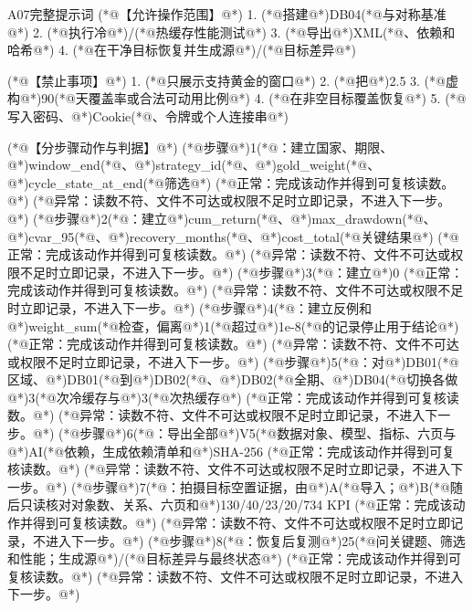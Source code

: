 \documentclass[UTF8,openany,zihao=-4]{ctexbook}
\renewcommand{\_}{\textunderscore\allowbreak}
\begin{document}
\begin{PromptBox}{A07完整提示词}
(*@{\promptcjk 【允许操作范围】}@*)
1. (*@{\promptcjk 搭建}@*)DB04(*@{\promptcjk 与对称基准}@*)
2. (*@{\promptcjk 执行冷}@*)/(*@{\promptcjk 热缓存性能测试}@*)
3. (*@{\promptcjk 导出}@*)XML(*@{\promptcjk 、依赖和哈希}@*)
4. (*@{\promptcjk 在干净目标恢复并生成源}@*)/(*@{\promptcjk 目标差异}@*)

(*@{\promptcjk 【禁止事项】}@*)
1. (*@{\promptcjk 只展示支持黄金的窗口}@*)
2. (*@{\promptcjk 把}@*)2.5%
3. (*@{\promptcjk 虚构}@*)90(*@{\promptcjk 天覆盖率或合法可动用比例}@*)
4. (*@{\promptcjk 在非空目标覆盖恢复}@*)
5. (*@{\promptcjk 写入密码、}@*)Cookie(*@{\promptcjk 、令牌或个人连接串}@*)

(*@{\promptcjk 【分步骤动作与判据】}@*)
(*@{\promptcjk 步骤}@*)1(*@{\promptcjk ：建立国家、期限、}@*)window_end(*@{\promptcjk 、}@*)strategy_id(*@{\promptcjk 、}@*)gold_weight(*@{\promptcjk 、}@*)cycle_state_at_end(*@{\promptcjk 筛选}@*)
  (*@{\promptcjk 正常：完成该动作并得到可复核读数。}@*)
  (*@{\promptcjk 异常：读数不符、文件不可达或权限不足时立即记录，不进入下一步。}@*)
(*@{\promptcjk 步骤}@*)2(*@{\promptcjk ：建立}@*)cum_return(*@{\promptcjk 、}@*)max_drawdown(*@{\promptcjk 、}@*)cvar_95(*@{\promptcjk 、}@*)recovery_months(*@{\promptcjk 、}@*)cost_total(*@{\promptcjk 关键结果}@*)
  (*@{\promptcjk 正常：完成该动作并得到可复核读数。}@*)
  (*@{\promptcjk 异常：读数不符、文件不可达或权限不足时立即记录，不进入下一步。}@*)
(*@{\promptcjk 步骤}@*)3(*@{\promptcjk ：建立}@*)0%
  (*@{\promptcjk 正常：完成该动作并得到可复核读数。}@*)
  (*@{\promptcjk 异常：读数不符、文件不可达或权限不足时立即记录，不进入下一步。}@*)
(*@{\promptcjk 步骤}@*)4(*@{\promptcjk ：建立反例和}@*)weight_sum(*@{\promptcjk 检查，偏离}@*)1(*@{\promptcjk 超过}@*)1e-8(*@{\promptcjk 的记录停止用于结论}@*)
  (*@{\promptcjk 正常：完成该动作并得到可复核读数。}@*)
  (*@{\promptcjk 异常：读数不符、文件不可达或权限不足时立即记录，不进入下一步。}@*)
(*@{\promptcjk 步骤}@*)5(*@{\promptcjk ：对}@*)DB01(*@{\promptcjk 区域、}@*)DB01(*@{\promptcjk 到}@*)DB02(*@{\promptcjk 、}@*)DB02(*@{\promptcjk 全期、}@*)DB04(*@{\promptcjk 切换各做}@*)3(*@{\promptcjk 次冷缓存与}@*)3(*@{\promptcjk 次热缓存}@*)
  (*@{\promptcjk 正常：完成该动作并得到可复核读数。}@*)
  (*@{\promptcjk 异常：读数不符、文件不可达或权限不足时立即记录，不进入下一步。}@*)
(*@{\promptcjk 步骤}@*)6(*@{\promptcjk ：导出全部}@*)V5(*@{\promptcjk 数据对象、模型、指标、六页与}@*)AI(*@{\promptcjk 依赖，生成依赖清单和}@*)SHA-256
  (*@{\promptcjk 正常：完成该动作并得到可复核读数。}@*)
  (*@{\promptcjk 异常：读数不符、文件不可达或权限不足时立即记录，不进入下一步。}@*)
(*@{\promptcjk 步骤}@*)7(*@{\promptcjk ：拍摄目标空置证据，由}@*)A(*@{\promptcjk 导入；}@*)B(*@{\promptcjk 随后只读核对对象数、关系、六页和}@*)130/40/23/20/734 KPI
  (*@{\promptcjk 正常：完成该动作并得到可复核读数。}@*)
  (*@{\promptcjk 异常：读数不符、文件不可达或权限不足时立即记录，不进入下一步。}@*)
(*@{\promptcjk 步骤}@*)8(*@{\promptcjk ：恢复后复测}@*)25(*@{\promptcjk 问关键题、筛选和性能；生成源}@*)/(*@{\promptcjk 目标差异与最终状态}@*)
  (*@{\promptcjk 正常：完成该动作并得到可复核读数。}@*)
  (*@{\promptcjk 异常：读数不符、文件不可达或权限不足时立即记录，不进入下一步。}@*)


\end{PromptBox}
\end{document}
